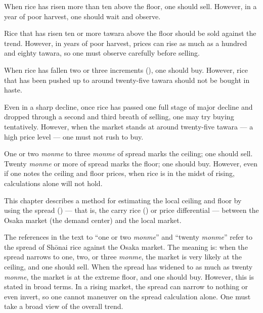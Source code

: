 
\begin{sokyubox}
{\small\itshape\color{sokyubar} }

\medskip
When rice has risen more than ten  above
the floor, one should sell. However, in a year of poor harvest, one
should wait and observe.
\end{sokyubox}

\commentary
Rice that has risen ten or more tawara above the floor should be
sold against the trend. However, in years of poor harvest, prices
can rise as much as a hundred and eighty tawara, so one must observe
carefully before selling.

\begin{sokyubox}
When rice has fallen two or three increments (), one should
buy. However, rice that has been pushed up to around twenty-five
tawara should not be bought in haste.
\end{sokyubox}

\commentary
Even in a sharp decline, once rice has passed one full stage of
major decline and dropped through a second and third breath of
selling, one may try buying tentatively. However, when the market
stands at around twenty-five tawara --- a high price level --- one must
not rush to buy.

\begin{sokyubox}
One or two \textit{monme} to three \textit{monme} of spread marks the ceiling; one
should sell. Twenty \textit{monme} or more of spread marks the floor; one
should buy. However, even if one notes the ceiling and floor prices,
when rice is in the midst of rising, calculations alone will not
hold.
\end{sokyubox}

\commentary
This chapter describes a method for estimating the local ceiling
and floor by using the spread () --- that is, the carry
rice () or price differential --- between the Osaka
market (the demand center) and the local market.

The references in the text to ``one or two \textit{monme}'' and ``twenty \textit{monme}''
refer to the spread of Sh\=onai rice against the Osaka market. The
meaning is: when the spread narrows to one, two, or three \textit{monme},
the market is very likely at the ceiling, and one should sell. When
the spread has widened to as much as twenty \textit{monme}, the market is
at the extreme floor, and one should buy. However, this is stated
in broad terms. In a rising market, the spread can narrow to nothing
or even invert, so one cannot maneuver on the spread calculation
alone. One must take a broad view of the overall trend.

